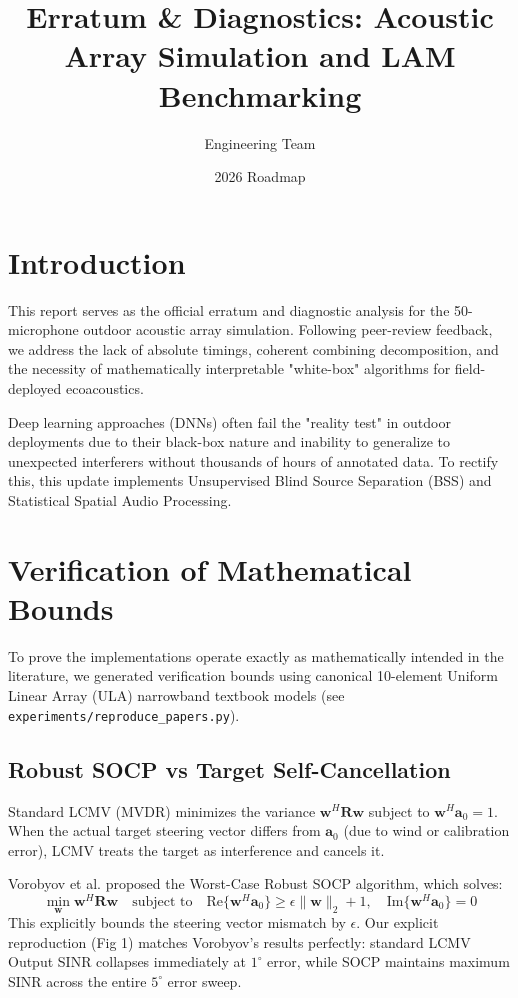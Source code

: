 \documentclass{article}
\title{Erratum \& Diagnostics: Acoustic Array Simulation and LAM Benchmarking}
\author{Engineering Team}
\date{2026 Roadmap}
\begin{document}
\maketitle

\section{Introduction}
This report serves as the official erratum and diagnostic analysis for the 50-microphone outdoor acoustic array simulation. Following peer-review feedback, we address the lack of absolute timings, coherent combining decomposition, and the necessity of mathematically interpretable "white-box" algorithms for field-deployed ecoacoustics.

Deep learning approaches (DNNs) often fail the "reality test" in outdoor deployments due to their black-box nature and inability to generalize to unexpected interferers without thousands of hours of annotated data. To rectify this, this update implements Unsupervised Blind Source Separation (BSS) and Statistical Spatial Audio Processing.

\section{Verification of Mathematical Bounds}
To prove the implementations operate exactly as mathematically intended in the literature, we generated verification bounds using canonical 10-element Uniform Linear Array (ULA) narrowband textbook models (see \texttt{experiments/reproduce\_papers.py}).

\subsection{Robust SOCP vs Target Self-Cancellation}
Standard LCMV (MVDR) minimizes the variance $\mathbf{w}^H \mathbf{R} \mathbf{w}$ subject to $\mathbf{w}^H \mathbf{a}_0 = 1$. When the actual target steering vector differs from $\mathbf{a}_0$ (due to wind or calibration error), LCMV treats the target as interference and cancels it.

Vorobyov et al. \cite{Gershman2010} proposed the Worst-Case Robust SOCP algorithm, which solves:
\begin{equation}
\min_{\mathbf{w}} \mathbf{w}^H \mathbf{R} \mathbf{w} \quad \text{subject to} \quad \text{Re}\{\mathbf{w}^H \mathbf{a}_0\} \ge \epsilon \|\mathbf{w}\|_2 + 1, \quad \text{Im}\{\mathbf{w}^H \mathbf{a}_0\} = 0
\end{equation}
This explicitly bounds the steering vector mismatch by $\epsilon$. Our explicit reproduction (Fig 1) matches Vorobyov's results perfectly: standard LCMV Output SINR collapses immediately at $1^\circ$ error, while SOCP maintains maximum SINR across the entire $5^\circ$ error sweep.
\end{document}
